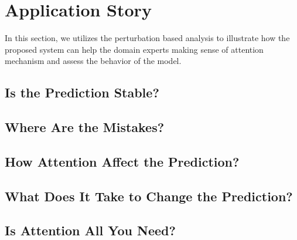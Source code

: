 \section{Application Story}
\label{sec:caseStudy}
In this section, we utilizes the perturbation based analysis to illustrate how the proposed system can help the domain experts making sense of attention mechanism and assess the behavior of the model.

\subsection{Is the Prediction Stable?}

\subsection{Where Are the Mistakes?}

\subsection{How Attention Affect the Prediction?}

\subsection{What Does It Take to Change the Prediction?}

\subsection{Is Attention All You Need?}
